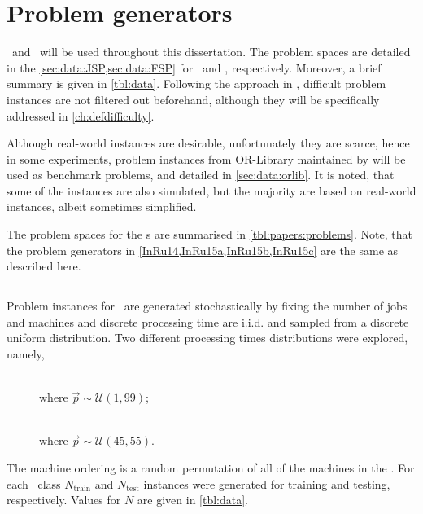 
\chapter{Problem generators}\label{ch:genprobleminstances} 

 \JSP\ and \FSP\  will be used  throughout this dissertation. The  problem spaces are detailed in the \cref{sec:data:JSP,sec:data:FSP} for \JSP\ and \FSP, respectively. Moreover, a brief summary is given in \cref{tbl:data}.
Following the approach in \citet{Whitley}, difficult problem instances are not 
filtered out beforehand, although they will be specifically addressed in 
\cref{ch:defdifficulty}. 

Although real-world instances are desirable, unfortunately they are scarce, hence in some experiments, problem instances from OR-Library maintained by \citet{ORlibrary} will be used as benchmark problems, and detailed in \cref{sec:data:orlib}. It is noted, that some of the instances are also simulated, but the majority are based on real-world instances, albeit sometimes simplified. 

The problem spaces for the s are summarised in 
\cref{tbl:papers:problems}. Note, that the problem generators in 
\cref{InRu14,InRu15a,InRu15b,InRu15c} are the same as described here.



\section{\Jsp}\label{sec:data:JSP}
Problem instances for \JSP\ are generated stochastically by fixing the number of jobs and machines and 
discrete processing time are i.i.d. and sampled from a discrete uniform distribution. %
Two different processing times distributions were explored, namely,
\begin{description}
	\item[\Jrnd]  \hfill \\ where $\vec{p}\sim\mathcal{U}(1,99)$;
	\item[\Jrndn]  \hfill \\ where $\vec{p}\sim\mathcal{U}(45,55)$.
\end{description}
The machine ordering is a random permutation of all of the machines in the \jsp. 
For each \JSP\ class $N_{\text{train}}$  and $N_{\text{test}}$ instances were generated for training and testing, respectively. Values for $N$ are given in \cref{tbl:data}. 

